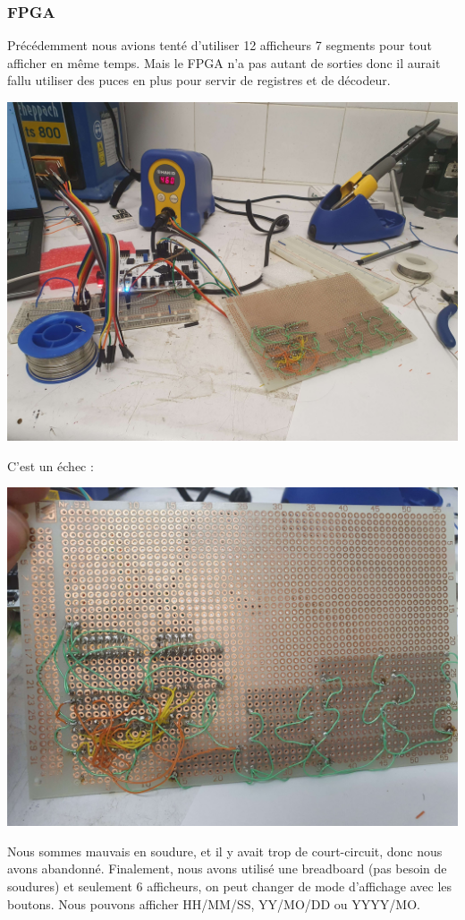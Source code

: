 \documentclass{beamer}
\begin{document}
\begin{frame}
    \frametitle{FPGA}
    Précédemment nous avions tenté d'utiliser 12 afficheurs 7 segments pour tout afficher en même temps.
    Mais le FPGA n'a pas autant de sorties donc il aurait fallu utiliser des puces en plus pour servir
    de registres et de décodeur.
    \begin{center}
        \includegraphics[scale=0.05]{pictures/Soudure global.jpg}
    \end{center}
\end{frame}

\begin{frame}
    C'est un échec :
    \begin{center}
        \includegraphics[scale=0.07]{pictures/Soudure proche.jpg}
    \end{center}
\end{frame}

\begin{frame}
    Nous sommes mauvais en soudure, et il y avait trop de court-circuit, donc nous avons abandonné.
    Finalement, nous avons utilisé une breadboard (pas besoin de soudures) et seulement 6 afficheurs,
    on peut changer de mode d'affichage avec les boutons. Nous pouvons afficher HH/MM/SS, YY/MO/DD
    ou YYYY/MO.
\end{frame}
\end{document}
